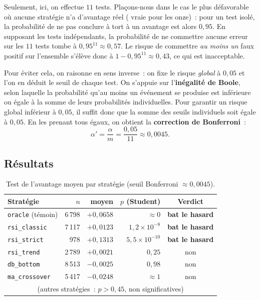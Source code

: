 Seulement, ici, on effectue \(11\) tests. Plaçons-nous dans le cas le plus
défavorable où aucune stratégie n'a d'avantage réel (\Hzero{} vraie pour
les onze)~: pour un test isolé, la probabilité de ne pas conclure à tort à
un avantage est alors \(0{,}95\). En supposant les tests indépendants, la
probabilité de ne commettre aucune erreur sur les \(11\) tests tombe à
\(0{,}95^{11} \approx 0{,}57\). Le risque de commettre \emph{au moins un}
faux positif sur l'ensemble s'élève donc à
\(1 - 0{,}95^{11} \approx 0{,}43\), ce qui est inacceptable.

Pour éviter cela, on raisonne en sens inverse~: on fixe le risque
\emph{global} à \(0{,}05\) et l'on en déduit le seuil de chaque test.
On s'appuie sur l'\textbf{inégalité de Boole}, selon laquelle la
probabilité qu'au moins un événement se produise est inférieure ou égale
à la somme de leurs probabilités individuelles. Pour garantir un risque
global inférieur à \(0{,}05\), il suffit donc que la somme des seuils
individuels soit égale à \(0{,}05\). En les prenant tous égaux, on obtient
la \textbf{correction de Bonferroni}~:
\[
  \alpha' = \frac{\alpha}{m} = \frac{0{,}05}{11} \approx 0{,}0045 .
\]

\subsection{Résultats}
\begin{table}[H]
\centering
\caption{Test de l'avantage moyen par stratégie (seuil Bonferroni $\approx 0{,}0045$).}
\label{tab:b1-etape1}
\small
\begin{tabular}{@{}lrrrc@{}}
\toprule
Stratégie & $n$ & \edgevar{} moyen & $p$ (Student) & Verdict \\
\midrule
\texttt{oracle} (témoin) & 6\,798 & $+0{,}0658$ & $\approx 0$    & \textbf{bat le hasard} \\
\midrule
\texttt{rsi\_classic} & 7\,117 & $+0{,}0123$ & $1{,}2\times10^{-8}$  & \textbf{bat le hasard} \\
\texttt{rsi\_strict}  &   978  & $+0{,}1313$ & $5{,}5\times10^{-10}$ & \textbf{bat le hasard} \\
\texttt{rsi\_trend}   & 2\,789 & $+0{,}0021$ & $0{,}25$             & non \\
\texttt{db\_bottom}   & 8\,513 & $-0{,}0025$ & $0{,}98$             & non \\
\texttt{ma\_crossover}& 5\,417 & $-0{,}0248$ & $\approx 1$          & non \\
\multicolumn{5}{c}{\footnotesize (autres stratégies~: $p>0{,}45$, non significatives)} \\
\bottomrule
\end{tabular}
\end{table}

